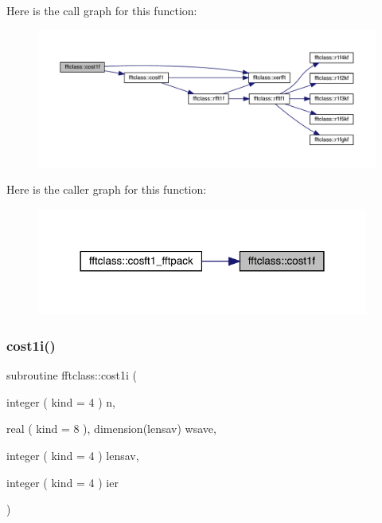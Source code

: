 Here is the call graph for this function\+:\nopagebreak
\begin{figure}[H]
\begin{center}
\leavevmode
\includegraphics[width=350pt]{namespacefftclass_ae01eaac3c675ef6c95b60a480bda63ba_cgraph}
\end{center}
\end{figure}
Here is the caller graph for this function\+:\nopagebreak
\begin{figure}[H]
\begin{center}
\leavevmode
\includegraphics[width=309pt]{namespacefftclass_ae01eaac3c675ef6c95b60a480bda63ba_icgraph}
\end{center}
\end{figure}
\mbox{\label{namespacefftclass_aa0605a45256c5ff2bfcd9229dd8854e4}} 
\subsubsection{\texorpdfstring{cost1i()}{cost1i()}}
{\footnotesize\ttfamily subroutine fftclass\+::cost1i (\begin{DoxyParamCaption}\item[{integer ( kind = 4 )}]{n,  }\item[{real ( kind = 8 ), dimension(lensav)}]{wsave,  }\item[{integer ( kind = 4 )}]{lensav,  }\item[{integer ( kind = 4 )}]{ier }\end{DoxyParamCaption})}

